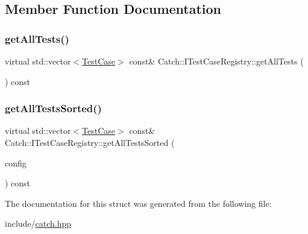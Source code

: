 \subsection{Member Function Documentation}
\mbox{\label{struct_catch_1_1_i_test_case_registry_ad6e4d4a621655123f73ae98cfeda063d}} 
\subsubsection{\texorpdfstring{get\+All\+Tests()}{getAllTests()}}
{\footnotesize\ttfamily virtual std\+::vector$<$\mbox{\hyperlink{class_catch_1_1_test_case}{Test\+Case}}$>$ const\& Catch\+::\+I\+Test\+Case\+Registry\+::get\+All\+Tests (\begin{DoxyParamCaption}{ }\end{DoxyParamCaption}) const\hspace{0.3cm}{\ttfamily [pure virtual]}}

\mbox{\label{struct_catch_1_1_i_test_case_registry_a33e46639d0319d35497c05bb5d02be5a}} 
\subsubsection{\texorpdfstring{get\+All\+Tests\+Sorted()}{getAllTestsSorted()}}
{\footnotesize\ttfamily virtual std\+::vector$<$\mbox{\hyperlink{class_catch_1_1_test_case}{Test\+Case}}$>$ const\& Catch\+::\+I\+Test\+Case\+Registry\+::get\+All\+Tests\+Sorted (\begin{DoxyParamCaption}\item[{I\+Config const \&}]{config }\end{DoxyParamCaption}) const\hspace{0.3cm}{\ttfamily [pure virtual]}}



The documentation for this struct was generated from the following file\+:\begin{DoxyCompactItemize}
\item 
include/\mbox{\hyperlink{catch_8hpp}{catch.\+hpp}}\end{DoxyCompactItemize}

